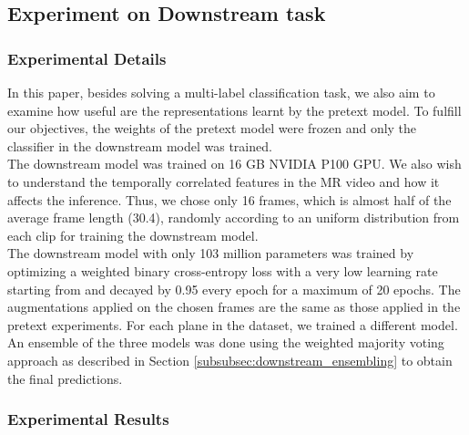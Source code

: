 \documentclass[journal]{IEEEtai}
\begin{document}
\subsection{Experiment on Downstream task}
\label{subsec:exp_downstream}

\subsubsection{Experimental Details}
\label{subsubsec:down_exp_det}
\indent In this paper, besides solving a multi-label classification task, we also aim to examine how useful are the representations learnt by the pretext model. To fulfill our objectives, the weights of the pretext model were frozen and only the classifier in the downstream model was trained.\\ \indent The downstream model was trained on 16 GB NVIDIA P100 GPU. We also wish to understand the temporally correlated features in the MR video and how it affects the inference. Thus, we chose only 16 frames, which is almost half of the average frame length (30.4), randomly according to an uniform distribution from each clip for training the downstream model. \\
\indent The downstream model with only 103 million parameters was trained by optimizing a weighted binary cross-entropy loss with a very low learning rate starting from  and decayed by 0.95 every epoch for a maximum of 20 epochs. The augmentations applied on the chosen frames are the same as those applied in the pretext experiments. For each plane in the dataset, we trained a different model. An ensemble of the three models was done using the weighted majority voting approach as described in Section \ref{subsubsec:downstream_ensembling} to obtain the final predictions. 

\subsubsection{Experimental Results}
\label{subsubsec:down_exp_res}
\end{document}
